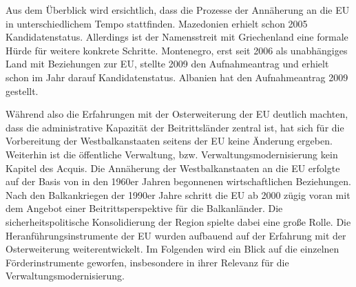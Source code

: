 Aus dem Überblick wird ersichtlich, dass die Prozesse der Annäherung an die EU in unterschiedlichem Tempo stattfinden. Mazedonien erhielt schon 2005 Kandidatenstatus. Allerdings ist der Namensstreit mit Griechenland eine formale Hürde für weitere konkrete Schritte. Montenegro, erst seit 2006 als unabhängiges Land mit Beziehungen zur EU, stellte 2009 den Aufnahmeantrag und erhielt schon im Jahr darauf Kandidatenstatus. Albanien hat den Aufnahmeantrag 2009 gestellt. \par
Während also die Erfahrungen mit der Osterweiterung der EU deutlich machten, dass die administrative Kapazität der Beitrittsländer zentral ist, hat sich für die Vorbereitung der Westbalkanstaaten seitens der EU keine Änderung ergeben. Weiterhin ist die öffentliche Verwaltung, bzw. Verwaltungsmodernisierung kein Kapitel des Acquis. Die Annäherung der Westbalkanstaaten an die EU erfolgte auf der Basis von in den 1960er Jahren begonnenen wirtschaftlichen Beziehungen. Nach den Balkankriegen der 1990er Jahre schritt die EU ab 2000 zügig voran mit dem Angebot einer Beitrittsperspektive für die Balkanländer. Die sicherheitspolitische Konsolidierung der Region spielte dabei eine große Rolle. Die Heranführungsinstrumente der EU wurden aufbauend auf der Erfahrung mit der Osterweiterung weiterentwickelt. Im Folgenden wird ein Blick auf die einzelnen Förderinstrumente geworfen, insbesondere in ihrer Relevanz für die Verwaltungsmodernisierung.

